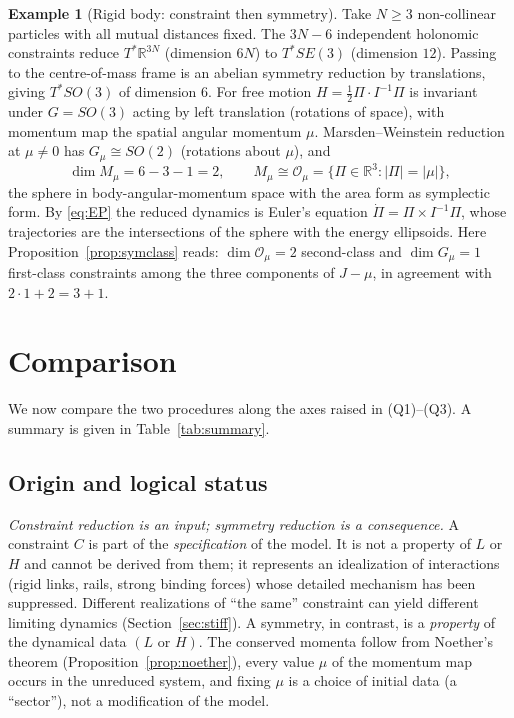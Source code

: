 \documentclass[11pt,a4paper]{article}
\numberwithin{equation}{section}
\theoremstyle{plain}
\theoremstyle{definition}
\newtheorem{example}[theorem]{Example}
\theoremstyle{remark}
\newcommand{\R}{\mathbb{R}}
\begin{document}
\begin{example}[Rigid body: constraint then symmetry]\label{ex:rigid}
Take $N\ge3$ non-collinear particles with all mutual distances fixed. The $3N-6$ independent holonomic constraints reduce $T^*\R^{3N}$ (dimension $6N$) to $T^*SE(3)$ (dimension $12$). Passing to the centre-of-mass frame is an abelian symmetry reduction by translations, giving $T^*SO(3)$ of dimension $6$. For free motion $H=\tfrac12\Pi\cdot I^{-1}\Pi$ is invariant under $G=SO(3)$ acting by left translation (rotations of space), with momentum map the spatial angular momentum $\mu$. Marsden--Weinstein reduction at $\mu\ne0$ has $G_\mu\cong SO(2)$ (rotations about $\mu$), and
\[
\dim M_\mu=6-3-1=2,\qquad M_\mu\cong\mathcal O_\mu=\{\Pi\in\R^3:|\Pi|=|\mu|\},
\]
the sphere in body-angular-momentum space with the area form as symplectic form. By \eqref{eq:EP} the reduced dynamics is Euler's equation $\dot\Pi=\Pi\times I^{-1}\Pi$, whose trajectories are the intersections of the sphere with the energy ellipsoids. Here Proposition~\ref{prop:symclass} reads: $\dim\mathcal O_\mu=2$ second-class and $\dim G_\mu=1$ first-class constraints among the three components of $J-\mu$, in agreement with $2\cdot1+2=3+1$.
\end{example}

\section{Comparison}\label{sec:compare}

We now compare the two procedures along the axes raised in (Q1)--(Q3). A summary is given in Table~\ref{tab:summary}.

\subsection{Origin and logical status}

\emph{Constraint reduction is an input; symmetry reduction is a consequence.} A constraint $C$ is part of the \emph{specification} of the model. It is not a property of $L$ or $H$ and cannot be derived from them; it represents an idealization of interactions (rigid links, rails, strong binding forces) whose detailed mechanism has been suppressed. Different realizations of ``the same'' constraint can yield different limiting dynamics (Section~\ref{sec:stiff}). A symmetry, in contrast, is a \emph{property} of the dynamical data $(L\text{ or }H)$. The conserved momenta follow from Noether's theorem (Proposition~\ref{prop:noether}), every value $\mu$ of the momentum map occurs in the unreduced system, and fixing $\mu$ is a choice of initial data (a ``sector''), not a modification of the model.
\end{document}
